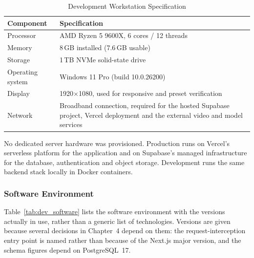 \documentclass[12pt, oneside]{article} %
\newcommand{\tabbreak}{\hyphenpenalty=200\exhyphenpenalty=200\tolerance=4000\hbadness=10000\hspace{0pt}}
\newcommand{\tcode}[1]{\path{#1}}
\begin{document}
\begin{table}[H]
\caption{Development Workstation Specification}
\label{tab:dev_hardware}
\vspace{-4mm}
\begin{center}
\renewcommand{\arraystretch}{1.25}
\footnotesize
\begin{tabular}{|>{\raggedright\arraybackslash\tabbreak}p{4.0cm}|>{\raggedright\arraybackslash\tabbreak}p{9.81cm}|}
\hline
\textbf{Component} & \textbf{Specification} \\
\hline \hline
Processor & AMD Ryzen 5 9600X, 6 cores / 12 threads \\ \hline
Memory & 8\,GB installed (7.6\,GB usable) \\ \hline
Storage & 1\,TB NVMe solid-state drive \\ \hline
Operating system & Windows 11 Pro (build 10.0.26200) \\ \hline
Display & 1920$\times$1080, used for responsive and preset verification \\ \hline
Network & Broadband connection, required for the hosted Supabase project, Vercel deployment and the external video and model services \\ \hline
\end{tabular}
\end{center}
\end{table}

No dedicated server hardware was provisioned. Production runs on Vercel's serverless platform for the application and on Supabase's managed infrastructure for the database, authentication and object storage. Development runs the same backend stack locally in Docker containers.

\subsubsection{Software Environment}

Table~\ref{tab:dev_software} lists the software environment with the versions actually in use, rather than a generic list of technologies. Versions are given because several decisions in Chapter~4 depend on them: the request-interception entry point is named \tcode{proxy} rather than \tcode{middleware} because of the Next.js major version, and the schema figures depend on PostgreSQL~17.
\end{document}
